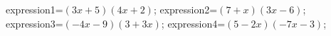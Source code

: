 \documentclass[exercice]{thedocument}%
\begin{document}
%
    \>expression1=$(3x+5)(4x+2)$;%
    \>expression2=$(7+x)(3x-6)$;%
    \>expression3=$(-4x-9)(3+3x)$;%
    \>expression4=$(5-2x)(-7x-3)$;%
\end{document}
